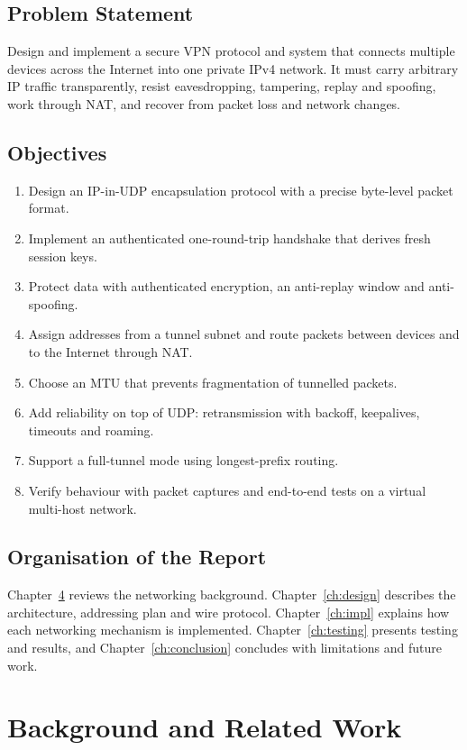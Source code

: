 \documentclass[12pt,a4paper]{report}
\begin{document}
\section{Problem Statement}
Design and implement a secure VPN protocol and system that connects multiple devices
across the Internet into one private IPv4 network. It must carry arbitrary IP traffic
transparently, resist eavesdropping, tampering, replay and spoofing, work through NAT,
and recover from packet loss and network changes.

\section{Objectives}
\begin{enumerate}
  \item Design an IP-in-UDP encapsulation protocol with a precise byte-level packet format.
  \item Implement an authenticated one-round-trip handshake that derives fresh session keys.
  \item Protect data with authenticated encryption, an anti-replay window and anti-spoofing.
  \item Assign addresses from a tunnel subnet and route packets between devices and to the Internet through NAT.
  \item Choose an MTU that prevents fragmentation of tunnelled packets.
  \item Add reliability on top of UDP: retransmission with backoff, keepalives, timeouts and roaming.
  \item Support a full-tunnel mode using longest-prefix routing.
  \item Verify behaviour with packet captures and end-to-end tests on a virtual multi-host network.
\end{enumerate}

\section{Organisation of the Report}
Chapter~\ref{ch:background} reviews the networking background. Chapter~\ref{ch:design}
describes the architecture, addressing plan and wire protocol. Chapter~\ref{ch:impl}
explains how each networking mechanism is implemented. Chapter~\ref{ch:testing}
presents testing and results, and Chapter~\ref{ch:conclusion} concludes with
limitations and future work.

\chapter{Background and Related Work}\label{ch:background}
\end{document}
